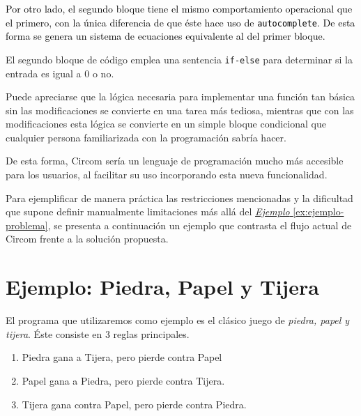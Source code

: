 \documentclass[a4paper,12pt]{report}
\begin{document}
	\vspace{0,2cm}
	\noindent \textcolor{black}{Por otro lado, el segundo bloque tiene el mismo comportamiento operacional que el primero, con la única diferencia de que éste hace uso de \texttt{autocomplete}. De esta forma se genera un sistema de ecuaciones equivalente al del primer bloque.}
	
	\vspace{0,2cm}
	\noindent El segundo bloque de código emplea una sentencia \texttt{if-else} para determinar si la entrada es igual a 0 o no.
	
	\vspace{0,2cm}
	\noindent Puede apreciarse que la lógica necesaria para implementar una función tan básica sin las modificaciones se convierte en una tarea más tediosa, mientras que con las modificaciones esta lógica se convierte en un simple bloque condicional que cualquier persona familiarizada con la programación sabría hacer.
	
	\vspace{0.2cm}
	\noindent De esta forma, Circom sería un lenguaje de programación mucho más accesible para los usuarios, al facilitar su uso incorporando esta nueva funcionalidad.
	
	\vspace{0.2cm}
	\noindent Para ejemplificar de manera práctica las restricciones mencionadas y la dificultad que supone definir manualmente limitaciones más allá del \hyperref[ex:ejemplo-problema]{\textit{Ejemplo} \ref{ex:ejemplo-problema}}, se presenta a continuación un ejemplo que contrasta el flujo actual de Circom frente a la solución propuesta. 
	
	\section{Ejemplo: Piedra, Papel y Tijera}
	\label{s:ex-ppt}
	
	\vspace{0.2cm}
	\noindent El programa que utilizaremos como ejemplo es el clásico juego de \textit{piedra, papel y tijera}. Éste consiste en 3 reglas principales.
	
	\vspace{0.2cm}
	\begin{enumerate}
		\item Piedra gana a Tijera, pero pierde contra Papel
		\item Papel gana a Piedra, pero pierde contra Tijera.
		\item Tijera gana contra Papel, pero pierde contra Piedra.
	\end{enumerate}
	
\end{document}
